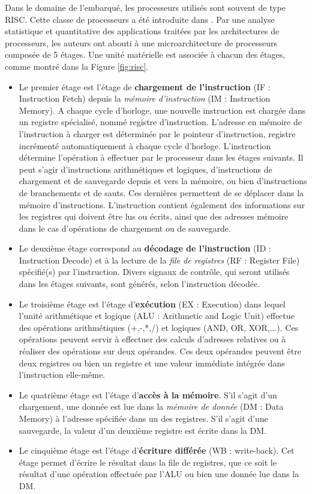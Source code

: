 Dans le domaine de l'embarqué, les processeurs utilisés sont souvent de type RISC. Cette classe de processeurs a été introduite dans \cite{hennessy2011computer}. Par une analyse statistique et quantitative des applications traitées par les architectures de processeurs, les auteurs ont abouti à une microarchitecture de processeurs composée de 5 étages. Une unité matérielle est associée à chacun des étages, comme montré dans la Figure \ref{fig:risc}.

\begin{itemize}
  \item Le premier étage est l'étage de \textbf{chargement de l'instruction} (IF : Instruction Fetch) depuis la \textit{mémoire d'instruction} (IM : Instruction Memory). A chaque cycle d'horloge, une nouvelle instruction est chargée dans un registre spécialisé, nommé registre d'instruction. L'adresse en mémoire de l'instruction à charger est déterminée par le pointeur d'instruction, registre incrémenté automatiquement à chaque cycle d'horloge. L'instruction détermine l'opération à effectuer par le processeur dans les étages suivants. Il peut s'agir d'instructions arithmétiques et logiques, d'instructions de chargement et de sauvegarde depuis et vers la mémoire, ou bien d'instructions de branchements et de sauts. Ces dernières permettent de se déplacer dans la mémoire d'instructions. L'instruction contient également des informations sur les registres qui doivent être lus ou écrits, ainsi que des adresses mémoire dans le cas d'opérations de chargement ou de sauvegarde.

  \item Le deuxième étage correspond au \textbf{décodage de l'instruction} (ID : Instruction Decode) et à la lecture de la \textit{file de registres} (RF : Register File) spécifié(s) par l'instruction. Divers signaux de contrôle, qui seront utilisés dans les étages suivants, sont générés, selon l'instruction décodée.

  \item Le troisième étage est l'étage d'\textbf{exécution} (EX : Execution) dans lequel l'unité arithmétique et logique (ALU : Arithmetic and Logic Unit) effectue des opérations arithmétiques (+,-,*,/) et logiques (AND, OR, XOR,...). Ces opérations peuvent servir à effectuer des calculs d'adresses relatives ou à réaliser des opérations sur deux opérandes. Ces deux opérandes peuvent être deux registres ou bien un registre et une valeur immédiate intégrée dans l'instruction elle-même.

  \item Le quatrième étage est l'étage d'\textbf{accès à la mémoire}. S'il s'agit d'un chargement, une donnée est lue dans la \textit{mémoire de donnée} (DM : Data Memory) à l'adresse spécifiée dans un des registres. S'il s'agit d'une sauvegarde, la valeur d'un deuxième registre est écrite dans la DM.

  \item Le cinquième étage est l'étage d'\textbf{écriture différée} (WB : write-back). Cet étage permet d'écrire le résultat dans la file de registres, que ce soit le résultat d'une opération effectuée par l'ALU ou bien une donnée lue dans la DM.
\end{itemize}

